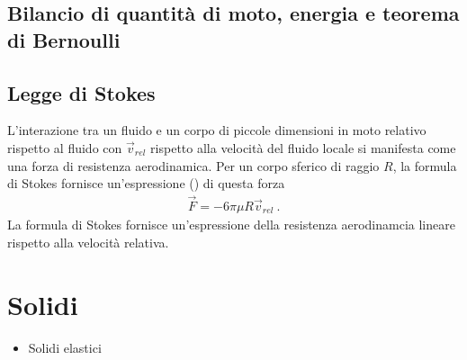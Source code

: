 \documentclass[letterpaper,10pt,italian]{jupyterBook}
\begin{document}
\subsection{Bilancio di quantità di moto, energia e teorema di Bernoulli}
\label{\detokenize{ch/continuum/intro:bilancio-di-quantita-di-moto-energia-e-teorema-di-bernoulli}}\label{\detokenize{ch/continuum/intro:fluids-dynamics-bernoulli}}

\subsection{Legge di Stokes}
\label{\detokenize{ch/continuum/intro:legge-di-stokes}}\label{\detokenize{ch/continuum/intro:fluids-dynamics-stokes}}
\sphinxAtStartPar
L’interazione tra un fluido e un corpo di piccole dimensioni in moto relativo rispetto al fluido con  \(\vec{v}_{rel}\) rispetto alla velocità del fluido locale si manifesta come una forza di resistenza aerodinamica. Per un corpo sferico di raggio \(R\), la formula di Stokes fornisce un’espressione  () di questa forza
\begin{equation*}
\begin{split}\vec{F} = - 6 \pi \mu R \vec{v}_{rel} \ .\end{split}
\end{equation*}
\sphinxAtStartPar
La formula di Stokes fornisce un’espressione della resistenza aerodinamcia lineare rispetto alla velocità relativa.

\sphinxAtStartPar
{} 


\section{Solidi}
\label{\detokenize{ch/continuum/intro:solidi}}\label{\detokenize{ch/continuum/intro:continuum-solids}}\begin{itemize}
\item {} 
\sphinxAtStartPar
Solidi elastici

\end{itemize}
\end{document}

